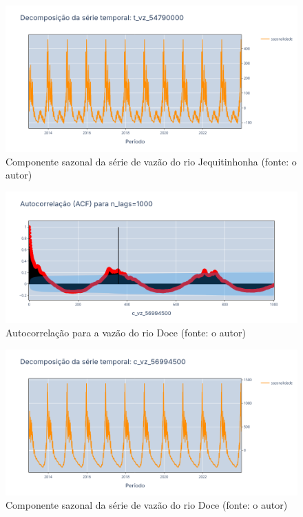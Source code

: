 \begin{figure}[!h]
\centering
\includegraphics[scale=0.33]{Figuras/sazonalidade_jequitinhonha.png}
\caption{Componente sazonal da série de vazão do rio Jequitinhonha (fonte: o autor)}
\label{fig:sazonalidade_jequitinhonha}
\end{figure}

\begin{figure}[!h]
\centering
\includegraphics[scale=0.33]{Figuras/acf_rio_doce.png}
\caption{Autocorrelação para a vazão do rio Doce (fonte: o autor)}
\label{fig:acf_rio_doce}
\end{figure}

\begin{figure}[!h]
\centering
\includegraphics[scale=0.33]{Figuras/sazonalidade_rio_doce.png}
\caption{Componente sazonal da série de vazão do rio Doce (fonte: o autor)}
\label{fig:sazonalidade_rio_doce}
\end{figure}

